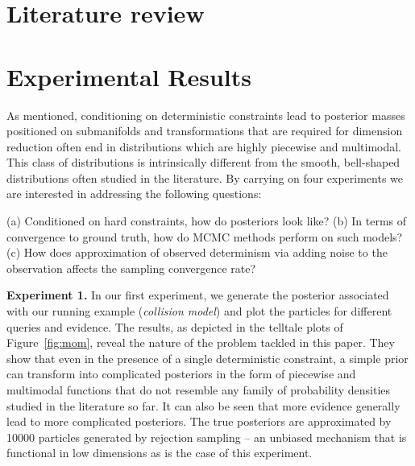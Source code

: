 \documentclass{article}
\begin{document}
\section{Literature review}
\label{sect:literature.review}
\section{Experimental Results}
\label{sect:experimental.results}
{\color{green}As mentioned, conditioning on deterministic constraints lead to posterior masses positioned  on submanifolds and transformations that are required for dimension reduction
often end in distributions which are highly piecewise and multimodal.
This class of distributions is intrinsically different from the smooth, bell-shaped distributions often studied in the literature. }
By carrying on four experiments we are interested in addressing the following questions: 

(a) Conditioned on hard constraints, how do posteriors look like? %
(b) In terms of convergence to ground truth, how do MCMC methods perform on such models? 
(c) How does approximation of observed determinism via adding noise to the observation affects the sampling convergence rate? 

\textbf{Experiment 1.} In our first experiment, we generate the posterior associated with our running example (\emph{collision model})
and plot the particles for different queries and evidence.%
The results, as depicted in the telltale plots of Figure~\ref{fig:mom}, reveal the nature of the problem tackled in this paper.
They show that even in the presence of a single deterministic constraint, 
a simple prior can transform into complicated posteriors in the form of piecewise and multimodal functions that do not resemble any family of 
probability densities studied in the literature so far. It can also be seen that more evidence generally lead to more complicated posteriors.
The true posteriors are approximated by 10000 particles generated by rejection sampling -- an unbiased mechanism that is functional in low dimensions as is the case of this experiment. 
\end{document}

